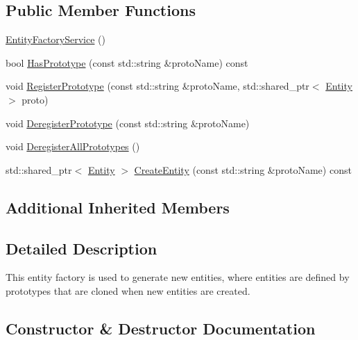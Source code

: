\subsection*{Public Member Functions}
\begin{DoxyCompactItemize}
\item 
\hyperlink{classastu_1_1EntityFactoryService_a7b88d3c794298156e1aacd60cc25e818}{Entity\+Factory\+Service} ()
\item 
bool \hyperlink{classastu_1_1EntityFactoryService_aa1b33aaf444b5d42e774522f0862df4a}{Has\+Prototype} (const std\+::string \&proto\+Name) const
\item 
void \hyperlink{classastu_1_1EntityFactoryService_ade1d8c60a6982c409501e58dcd8c2bc8}{Register\+Prototype} (const std\+::string \&proto\+Name, std\+::shared\+\_\+ptr$<$ \hyperlink{classastu_1_1Entity}{Entity} $>$ proto)
\item 
void \hyperlink{classastu_1_1EntityFactoryService_a0256f46b4344c1f66d1d6ed947992c62}{Deregister\+Prototype} (const std\+::string \&proto\+Name)
\item 
void \hyperlink{classastu_1_1EntityFactoryService_a2ffee25bef45ed4b845dd2b9c852496d}{Deregister\+All\+Prototypes} ()
\item 
std\+::shared\+\_\+ptr$<$ \hyperlink{classastu_1_1Entity}{Entity} $>$ \hyperlink{classastu_1_1EntityFactoryService_aef424f6a70cbc918bea4a7edd738877f}{Create\+Entity} (const std\+::string \&proto\+Name) const
\end{DoxyCompactItemize}
\subsection*{Additional Inherited Members}


\subsection{Detailed Description}
This entity factory is used to generate new entities, where entities are defined by prototypes that are cloned when new entities are created. 

\subsection{Constructor \& Destructor Documentation}
\mbox{\label{classastu_1_1EntityFactoryService_a7b88d3c794298156e1aacd60cc25e818}} 
